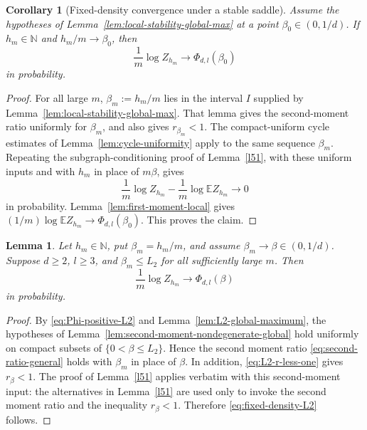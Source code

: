 \documentclass[11pt]{amsart}
\theoremstyle{plain}
\newtheorem{lemma}[theorem]{Lemma}
\newtheorem{corollary}[theorem]{Corollary}
\numberwithin{equation}{section}
\numberwithin{theorem}{section}
\numberwithin{figure}{section}
\begin{document}
\begin{corollary}[Fixed-density convergence under a stable saddle]
\label{cor:stable-saddle-fixed-density}
Assume the hypotheses of Lemma~\ref{lem:local-stability-global-max} at a point
\(\beta_0\in(0,1/d)\).  If \(h_m\in\mathbb N\) and \(h_m/m\to\beta_0\), then
\[
  \frac1m\log Z_{h_m}\longrightarrow \Phi_{d,l}(\beta_0)
\]
in probability.
\end{corollary}

\begin{proof}
For all large \(m\), \(\beta_m:=h_m/m\) lies in the interval \(I\) supplied by
Lemma~\ref{lem:local-stability-global-max}.  That lemma gives the second-moment
ratio uniformly for \(\beta_m\), and also gives \(r_{\beta_m}<1\).  The
compact-uniform cycle estimates of Lemma~\ref{lem:cycle-uniformity} apply to the
same sequence \(\beta_m\).  Repeating the subgraph-conditioning proof of
Lemma~\ref{l51}, with these uniform inputs and with \(h_m\) in place of
\(m\beta\), gives
\[
  \frac1m\log Z_{h_m}-\frac1m\log\mathbb E Z_{h_m}\longrightarrow0
\]
in probability.  Lemma~\ref{lem:first-moment-local} gives
\((1/m)\log\mathbb E Z_{h_m}\to\Phi_{d,l}(\beta_0)\).  This proves the claim.
\end{proof}

\begin{lemma}\label{lem:fixed-density-L2}
Let \(h_m\in\mathbb N\), put \(\beta_m=h_m/m\), and assume
\(\beta_m\to\beta\in(0,1/d)\).  Suppose \(d\ge2\), \(l\ge3\), and
\(\beta_m\le L_2\) for all sufficiently large \(m\).  Then
\begin{equation}\label{eq:fixed-density-L2}
  \frac1m\log Z_{h_m}\longrightarrow \Phi_{d,l}(\beta)
\end{equation}
in probability.
\end{lemma}

\begin{proof}
By \eqref{eq:Phi-positive-L2} and Lemma~\ref{lem:L2-global-maximum}, the hypotheses of
Lemma~\ref{lem:second-moment-nondegenerate-global} hold uniformly on compact subsets of
\(\{0<\beta\le L_2\}\).  Hence the second moment ratio
\eqref{eq:second-ratio-general} holds with \(\beta_m\) in place of \(\beta\).  In addition,
\eqref{eq:L2-r-less-one} gives \(r_\beta<1\).  The proof of Lemma~\ref{l51} applies
verbatim with this second-moment input: the alternatives in Lemma~\ref{l51} are used
only to invoke the second moment ratio and the inequality \(r_\beta<1\).  Therefore
\eqref{eq:fixed-density-L2} follows.
\end{proof}
\end{document}
